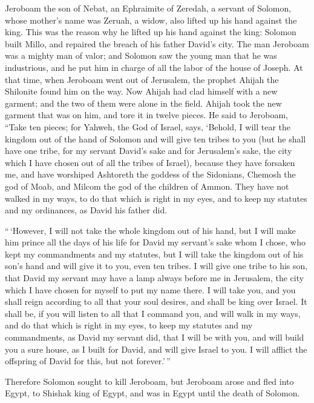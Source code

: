  Jeroboam the son of Nebat, an Ephraimite of Zeredah, a
servant of Solomon, whose mother's name was Zeruah, a widow, also lifted
up his hand against the king.  This was the reason why he
lifted up his hand against the king: Solomon built Millo, and repaired
the breach of his father David's city.  The man Jeroboam
was a mighty man of valor; and Solomon saw the young man that he was
industrious, and he put him in charge of all the labor of the house of
Joseph.  At that time, when Jeroboam went out of Jerusalem,
the prophet Ahijah the Shilonite found him on the way. Now Ahijah had
clad himself with a new garment; and the two of them were alone in the
field.  Ahijah took the new garment that was on him, and
tore it in twelve pieces.  He said to Jeroboam, ``Take ten
pieces; for Yahweh, the God of Israel, says, `Behold, I will tear the
kingdom out of the hand of Solomon and will give ten tribes to you
 (but he shall have one tribe, for my servant David's sake
and for Jerusalem's sake, the city which I have chosen out of all the
tribes of Israel),  because they have forsaken me, and have
worshiped Ashtoreth the goddess of the Sidonians, Chemosh the god of
Moab, and Milcom the god of the children of Ammon. They have not walked
in my ways, to do that which is right in my eyes, and to keep my
statutes and my ordinances, as David his father did.

 ``\,`However, I will not take the whole kingdom out of his
hand, but I will make him prince all the days of his life for David my
servant's sake whom I chose, who kept my commandments and my statutes,
 but I will take the kingdom out of his son's hand and will
give it to you, even ten tribes.  I will give one tribe to
his son, that David my servant may have a lamp always before me in
Jerusalem, the city which I have chosen for myself to put my name there.
 I will take you, and you shall reign according to all that
your soul desires, and shall be king over Israel.  It shall
be, if you will listen to all that I command you, and will walk in my
ways, and do that which is right in my eyes, to keep my statutes and my
commandments, as David my servant did, that I will be with you, and will
build you a sure house, as I built for David, and will give Israel to
you.  I will afflict the offspring of David for this, but
not forever.'\,''

 Therefore Solomon sought to kill Jeroboam, but Jeroboam
arose and fled into Egypt, to Shishak king of Egypt, and was in Egypt
until the death of Solomon.


